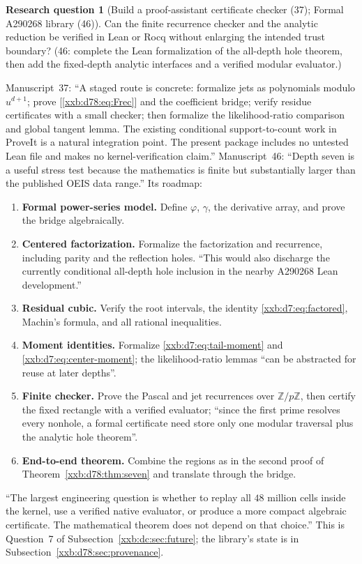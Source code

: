 \documentclass[11pt,a4paper]{article}
\numberwithin{equation}{section}
\theoremstyle{definition}
\newtheorem{question}[theorem]{Research question}
\theoremstyle{remark}
\theoremstyle{plain}
\newcommand{\Z}{\mathbb Z}
\begin{document}
\begin{question}[Build a proof-assistant certificate checker (37); Formal A290268 library (46)]\label{xxb:d78:q:formal}
Can the finite recurrence checker and the analytic reduction be verified in
Lean or Rocq without enlarging the intended trust boundary?  (46: complete the
Lean formalization of the all-depth hole theorem, then add the fixed-depth
analytic interfaces and a verified modular evaluator.)
\end{question}
Manuscript~37: ``A staged route is concrete: formalize jets as polynomials
modulo $u^{d+1}$; prove [\eqref{xxb:d78:eq:Frec}] and the coefficient bridge;
verify residue certificates with a small checker; then formalize the
likelihood-ratio comparison and global tangent lemma. The existing conditional
support-to-count work in ProveIt is a natural integration point. The present
package includes no untested Lean file and makes no kernel-verification
claim.''  Manuscript~46: ``Depth seven is a useful stress test because the
mathematics is finite but substantially larger than the published OEIS data
range.''  Its roadmap:
\begin{enumerate}[leftmargin=1.8em,itemsep=1pt]
\item \textbf{Formal power-series model.}  Define $\varphi$, $\gamma$, the
 derivative array, and prove the bridge algebraically.
\item \textbf{Centered factorization.}  Formalize the factorization and
 recurrence, including parity and the reflection holes.  ``This would also
 discharge the currently conditional all-depth hole inclusion in the nearby
 A290268 Lean development.''
\item \textbf{Residual cubic.}  Verify the root intervals, the identity
 \eqref{xxb:d7:eq:factored}, Machin's formula, and all rational inequalities.
\item \textbf{Moment identities.}  Formalize \eqref{xxb:d7:eq:tail-moment} and
 \eqref{xxb:d7:eq:center-moment}; the likelihood-ratio lemmas ``can be
 abstracted for reuse at later depths''.
\item \textbf{Finite checker.}  Prove the Pascal and jet recurrences over
 $\Z/p\Z$, then certify the fixed rectangle with a verified evaluator; ``since
 the first prime resolves every nonhole, a formal certificate need store only
 one modular traversal plus the analytic hole theorem''.
\item \textbf{End-to-end theorem.}  Combine the regions as in the second proof
 of Theorem~\ref{xxb:d78:thm:seven} and translate through the bridge.
\end{enumerate}
``The largest engineering question is whether to replay all $48$ million cells
inside the kernel, use a verified native evaluator, or produce a more compact
algebraic certificate.  The mathematical theorem does not depend on that
choice.''  This is Question~7 of Subsection~\ref{xxb:dc:sec:future}; the
library's state is in Subsection~\ref{xxb:d78:sec:provenance}.
\end{document}
